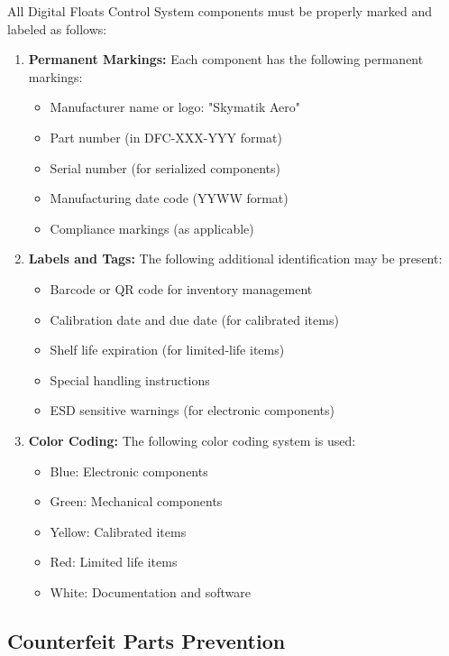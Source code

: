 \documentclass[12pt,a4paper,twoside,openright]{book}
\begin{document}
All Digital Floats Control System components must be properly marked and labeled as follows:

\begin{enumerate}
    \item \textbf{Permanent Markings:} Each component has the following permanent markings:
    \begin{itemize}
        \item Manufacturer name or logo: "Skymatik Aero"
        \item Part number (in DFC-XXX-YYY format)
        \item Serial number (for serialized components)
        \item Manufacturing date code (YYWW format)
        \item Compliance markings (as applicable)
    \end{itemize}
    
    \item \textbf{Labels and Tags:} The following additional identification may be present:
    \begin{itemize}
        \item Barcode or QR code for inventory management
        \item Calibration date and due date (for calibrated items)
        \item Shelf life expiration (for limited-life items)
        \item Special handling instructions
        \item ESD sensitive warnings (for electronic components)
    \end{itemize}
    
    \item \textbf{Color Coding:} The following color coding system is used:
    \begin{itemize}
        \item Blue: Electronic components
        \item Green: Mechanical components
        \item Yellow: Calibrated items
        \item Red: Limited life items
        \item White: Documentation and software
    \end{itemize}
\end{enumerate}

\subsection{Counterfeit Parts Prevention}
\end{document}
